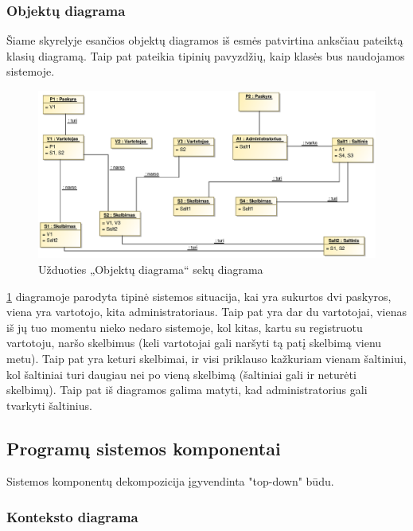\documentclass[12pt]{article}
\begin{document}
	\subsubsection{Objektų diagrama}
	
	Šiame skyrelyje esančios objektų diagramos iš esmės patvirtina anksčiau pateiktą klasių diagramą. Taip pat pateikia tipinių pavyzdžių, kaip klasės bus naudojamos sistemoje.
	
	\begin{figure}[h]
		\begin{center}
			\includegraphics[width=\textwidth]{ObjektuDiagrama.eps}
			\caption{Užduoties „Objektų diagrama“ sekų diagrama\label{ObjectDiagram}}
		\end{center}
	\end{figure}
	
	\ref{ObjectDiagram} diagramoje parodyta tipinė sistemos situacija, kai yra sukurtos dvi paskyros, viena yra vartotojo, kita administratoriaus. Taip pat yra dar du vartotojai, vienas iš jų tuo momentu nieko nedaro sistemoje, kol kitas, kartu su registruotu vartotoju, naršo skelbimus (keli vartotojai gali naršyti tą patį skelbimą vienu metu). Taip pat yra keturi skelbimai, ir visi priklauso kažkuriam vienam šaltiniui, kol šaltiniai turi daugiau nei po vieną skelbimą (šaltiniai gali ir neturėti skelbimų). Taip pat iš diagramos galima matyti, kad administratorius gali tvarkyti šaltinius.
	\pagebreak
	
	\subsection{Programų sistemos komponentai}
	
	Sistemos komponentų dekompozicija įgyvendinta "top-down" būdu.	
	
	\subsubsection{Konteksto diagrama}
	
\end{document}
